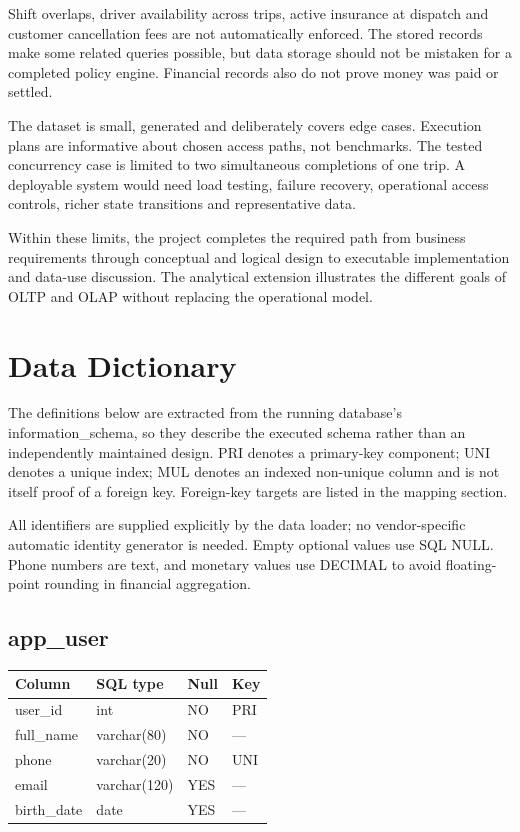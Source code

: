 \documentclass[11pt,a4paper]{article}
\renewcommand{\arraystretch}{1.3}
\begin{document}
Shift overlaps, driver availability across trips, active insurance at dispatch and customer cancellation fees are not automatically enforced. The stored records make some related queries possible, but data storage should not be mistaken for a completed policy engine. Financial records also do not prove money was paid or settled.

The dataset is small, generated and deliberately covers edge cases. Execution plans are informative about chosen access paths, not benchmarks. The tested concurrency case is limited to two simultaneous completions of one trip. A deployable system would need load testing, failure recovery, operational access controls, richer state transitions and representative data.

Within these limits, the project completes the required path from business requirements through conceptual and logical design to executable implementation and data-use discussion. The analytical extension illustrates the different goals of OLTP and OLAP without replacing the operational model.


\appendix
\clearpage
\section{Data Dictionary}
The definitions below are extracted from the running database's information\_\allowbreak{}schema, so they describe the executed schema rather than an independently maintained design. PRI denotes a primary-key component; UNI denotes a unique index; MUL denotes an indexed non-unique column and is not itself proof of a foreign key. Foreign-key targets are listed in the mapping section.

All identifiers are supplied explicitly by the data loader; no vendor-specific automatic identity generator is needed. Empty optional values use SQL NULL. Phone numbers are text, and monetary values use DECIMAL to avoid floating-point rounding in financial aggregation.

\begingroup\renewcommand{\arraystretch}{1.08}\titlespacing*{\subsection}{0pt}{7pt}{3pt}\subsection*{app\_\allowbreak{}user}
\par\begingroup\small\noindent
\begin{tabularx}{\linewidth}{p{4.4cm}p{4.0cm}p{1.5cm}X}
\toprule
Column & SQL type & Null & Key\\\midrule
user\_\allowbreak{}id & int & NO & PRI\\
full\_\allowbreak{}name & varchar(80) & NO & —\\
phone & varchar(20) & NO & UNI\\
email & varchar(120) & YES & —\\
birth\_\allowbreak{}date & date & YES & —\\
\bottomrule
\end{tabularx}
\par\endgroup
\end{document}
